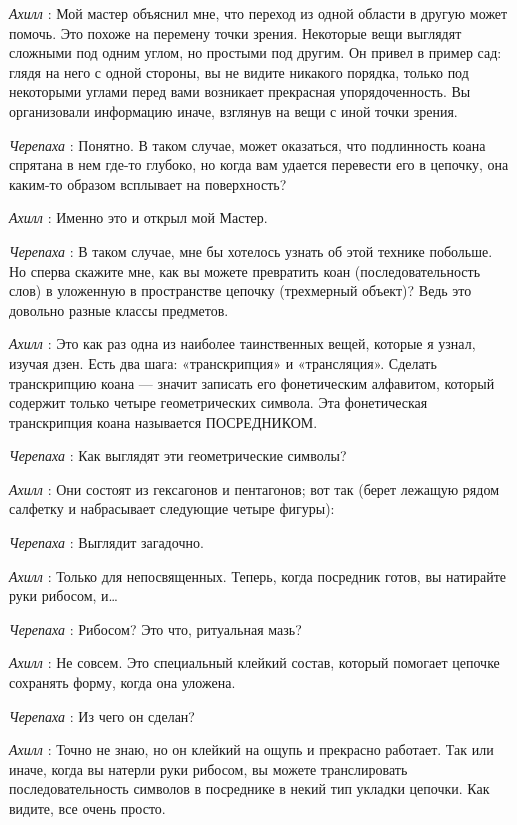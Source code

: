 \emph{Ахилл} : Мой мастер объяснил мне, что переход из одной области в другую может помочь. Это похоже на перемену точки зрения. Некоторые вещи выглядят сложными под одним углом, но простыми под другим. Он привел в пример сад: глядя на него с одной стороны, вы не видите никакого порядка, только под некоторыми углами перед вами возникает прекрасная упорядоченность. Вы организовали информацию иначе, взглянув на вещи с иной точки зрения.

\emph{Черепаха} : Понятно. В таком случае, может оказаться, что подлинность коана спрятана в нем где-то глубоко, но когда вам удается перевести его в цепочку, она каким-то образом всплывает на поверхность?

\emph{Ахилл} : Именно это и открыл мой Мастер.

\emph{Черепаха} : В таком случае, мне бы хотелось узнать об этой технике побольше. Но сперва скажите мне, как вы можете превратить коан (последовательность слов) в уложенную в пространстве цепочку (трехмерный объект)? Ведь это довольно разные классы предметов.

\emph{Ахилл} : Это как раз одна из наиболее таинственных вещей, которые я узнал, изучая дзен. Есть два шага: «транскрипция» и «трансляция». Сделать транскрипцию коана --- значит записать его фонетическим алфавитом, который содержит только четыре геометрических символа. Эта фонетическая транскрипция коана называется ПОСРЕДНИКОМ.

\emph{Черепаха} : Как выглядят эти геометрические символы?

\emph{Ахилл} : Они состоят из гексагонов и пентагонов; вот так (берет лежащую рядом салфетку и набрасывает следующие четыре фигуры):

\emph{Черепаха} : Выглядит загадочно.

\emph{Ахилл} : Только для непосвященных. Теперь, когда посредник готов, вы натирайте руки рибосом, и\ldots{}

\emph{Черепаха} : Рибосом? Это что, ритуальная мазь?

\emph{Ахилл} : Не совсем. Это специальный клейкий состав, который помогает цепочке сохранять форму, когда она уложена.

\emph{Черепаха} : Из чего он сделан?

\emph{Ахилл} : Точно не знаю, но он клейкий на ощупь и прекрасно работает. Так или иначе, когда вы натерли руки рибосом, вы можете транслировать последовательность символов в посреднике в некий тип укладки цепочки. Как видите, все очень просто.

